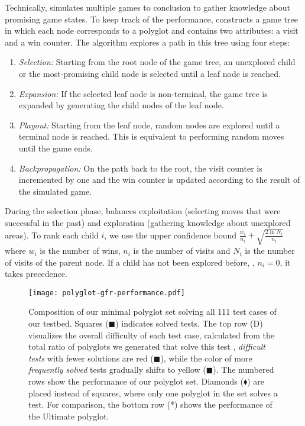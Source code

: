 Technically, \mcts{} simulates multiple games to conclusion to gather knowledge about promising game states.
To keep track of the performance, \mcts{} constructs a game tree in which each node corresponds to a polyglot and contains two attributes: a visit and a win counter. The algorithm explores a path in this tree using four steps:

\begin{enumerate}
\setlength\itemsep{-0.3em} %
\item \emph{Selection:} Starting from the root node of the game tree, an unexplored child or the most-promising child node is selected until a leaf node is reached.
\item \emph{Expansion:} If the selected leaf node is non-terminal, the game tree is expanded by generating the child nodes of the leaf node.
\item \emph{Playout:} Starting from the leaf node, random nodes are explored until a terminal node is reached. This is equivalent to performing random moves until the game ends.
\item \emph{Backpropagation:} On the path back to the root, the visit counter is incremented by one and the win counter is updated according to the result of the simulated game.
\end{enumerate}

During the selection phase, \mcts{} balances exploitation (selecting moves that were successful in the past) and exploration (gathering knowledge about unexplored areas).
To rank each child $i$, we use the upper confidence bound $\frac{w_i}{n_i} + \sqrt{\frac{2 \ln N_i}{n_i}}$ where $w_i$ is the number of wins, $n_i$ is the number of visits and $N_i$ is the number of visits of the parent node. If a child has not been explored before, \ie, $n_i=0$, it takes precedence.


\begin{figure*}[ht]
	\centering
    \texttt{[image: polyglot-gfr-performance.pdf]}\vspace{-3mm}%
	\caption{%
	Composition of our minimal polyglot set solving all \num{111} test cases of our testbed. 
	Squares (\textcolor{gfrcolor}{$\blacksquare$}) indicates solved tests.
	The top row (\textrm{D}) visualizes the overall difficulty of each test case, calculated from the total ratio of polyglots we generated that solve this test \ie, \emph{difficult tests} with fewer solutions are red (\textcolor{gfrred}{$\blacksquare$}), while the color of more \emph{frequently solved} tests gradually shifts to yellow (\textcolor{gfryellow}{$\blacksquare$}).
	The numbered rows show the performance of our polyglot set.
	Diamonds (\textcolor{gfrdiamond}{$\blacklozenge$}) are placed instead of squares, where only one polyglot in the set solves a test.
	For comparison, the bottom row (*) shows the performance of the Ultimate polyglot. 
	}%
    \label{fig:set-gfr-perfomance}
\end{figure*}

